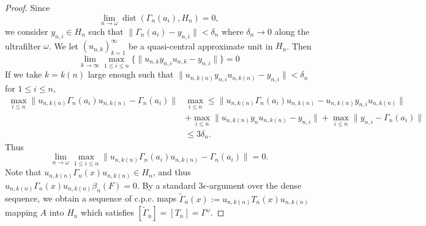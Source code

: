 \documentclass[12pt]{amsart}
\theoremstyle{plain}
\theoremstyle{definition}
\def\dist{\operatorname{dist}}
\numberwithin{equation}{section}
\begin{document}
\begin{proof}
Since \[ \lim_{n \to \omega} \dist(\Gamma_n(a_i), H_n)=0, \]
 we consider $y_{n, i} \in H_n$ such that $\| \Gamma_n(a_i) -y_{n, i}\| < \delta_n$ where $\delta_n \to 0$ along the ultrafilter $\omega$.   We let $(u_{n,k})_{k=1}^{\infty}$ be a quasi-central approximate unit in $H_n$.   Then 
 \[\lim_{k \to \infty}\max_{1\le  i \le n}\{ \|u_{n,k}y_{n,i}u_{n,k} -y_{n,i}\|\} =0\]
 If we take $k=k(n)$ large enough  such that $\|u_{n,k(n)} y_{n,i} u_{n,k(n)}- y_{n,i} \| < \delta_n$ for $1 \le i \le n$, 
 \[\begin{split}
 \max_{i \le n} \|u_{n,k(n)}\Gamma_n(a_i)u_{n,k(n)}  - \Gamma_n(a_i)\| & \max_{i \le n}\le \| u_{n,k(n)}\Gamma_n(a_i)u_{n,k(n)} - u_{n,k(n)}y_{n,i}u_{n,k(n)} \|  \\
  &+ \max_{i \le n}\| u_{n,k(n)}y_nu_{n,k(n)}- y_{n,i} \|+ \max_{i \le n}\|y_{n,i} -\Gamma_n(a_i) \| \\
  &\le 3 \delta_n.
  \end{split}
  \] Thus 
    \[\lim_{n\to \omega} \max_{1 \le i \le n} \| u_{n,k(n)}\Gamma_n(a_i)u_{n,k(n)} - \Gamma_n(a_i) \|=0. \]  Note that $u_{n, k(n)}\Gamma_n(x) u_{n, k(n)} \in H_n$,  and thus $u_{n, k(n)}\Gamma_n(x) u_{n, k(n)}\beta_n(F)=0$.  By a standard $3\epsilon$-argument over the dense sequence, we obtain a sequence of c.p.c. maps $\tilde{\Gamma}_n(x) := u_{n,k(n)} T_n(x) u_{n,k(n)}$ mapping $A$ into $H_n$ which satisfies $[\tilde{\Gamma}_n] = [T_n] = \Gamma^{\omega}$.
\end{proof}
\end{document}
